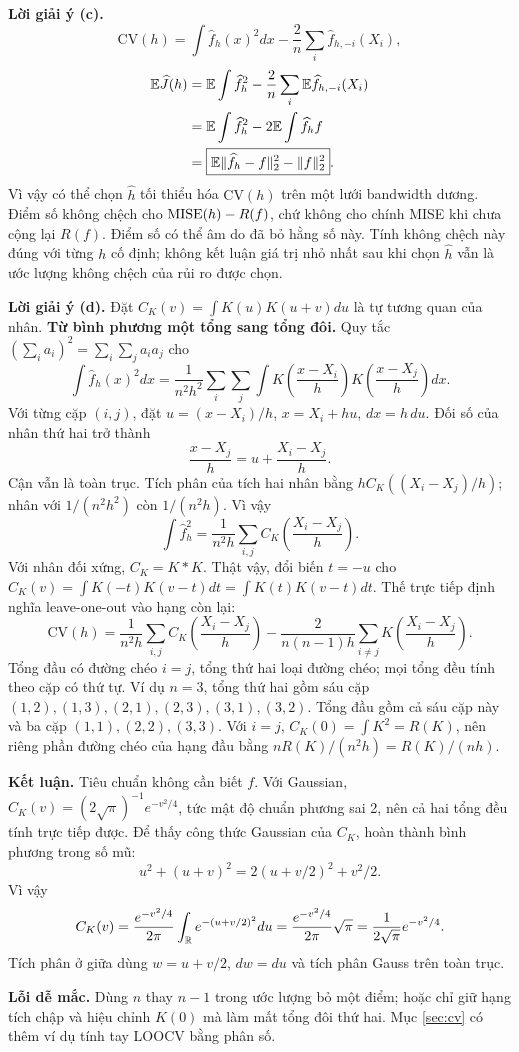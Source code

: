 \textbf{Lời giải ý (c).}
\[
\boxed{\mathrm{CV}(h)=\int\widehat f_h(x)^2dx
-\frac2n\sum_i\widehat f_{h,-i}(X_i),}
\]
\begin{align*}
\mathbb E\widehat J(h)
&=\mathbb E\int\widehat f_h^2-\frac2n\sum_i\mathbb E\widehat f_{h,-i}(X_i)\\
&=\mathbb E\int\widehat f_h^2-2\mathbb E\int\widehat f_h f\\
&=\boxed{\mathbb E\|\widehat f_h-f\|_2^2-\|f\|_2^2}.
\end{align*}
Vì vậy có thể chọn $\widehat h$ tối thiểu hóa $\mathrm{CV}(h)$ trên một lưới bandwidth dương.
Điểm số không chệch cho $\operatorname{MISE}(h)-R(f)$, chứ không cho chính MISE khi chưa cộng lại $R(f)$.
Điểm số có thể âm do đã bỏ hằng số này.
Tính không chệch này đúng với từng $h$ cố định;
không kết luận giá trị nhỏ nhất sau khi chọn $\widehat h$ vẫn là ước lượng không chệch của rủi ro được chọn.

\textbf{Lời giải ý (d).}
Đặt $C_K(v)=\int K(u)K(u+v)du$ là tự tương quan của nhân.
\textbf{Từ bình phương một tổng sang tổng đôi.}
Quy tắc $(\sum_i a_i)^2=\sum_i\sum_j a_ia_j$ cho
\[
\int\widehat f_h(x)^2dx
=\frac1{n^2h^2}\sum_i\sum_j
\int K\left(\frac{x-X_i}{h}\right)K\left(\frac{x-X_j}{h}\right)dx.
\]
Với từng cặp $(i,j)$, đặt $u=(x-X_i)/h$, $x=X_i+hu$, $dx=h\,du$.
Đối số của nhân thứ hai trở thành
\[
\frac{x-X_j}{h}=u+\frac{X_i-X_j}{h}.
\]
Cận vẫn là toàn trục. Tích phân của tích hai nhân bằng
$hC_K((X_i-X_j)/h)$; nhân với $1/(n^2h^2)$ còn $1/(n^2h)$.
Vì vậy
\[
\int\widehat f_h^2=\frac1{n^2h}\sum_{i,j}C_K\left(\frac{X_i-X_j}{h}\right).
\]
Với nhân đối xứng, $C_K=K*K$.
Thật vậy, đổi biến $t=-u$ cho
$C_K(v)=\int K(-t)K(v-t)dt=\int K(t)K(v-t)dt$.
Thế trực tiếp định nghĩa leave-one-out vào hạng còn lại:
\[
\boxed{\mathrm{CV}(h)=\frac1{n^2h}\sum_{i,j}C_K\left(\frac{X_i-X_j}{h}\right)
-\frac{2}{n(n-1)h}\sum_{i\ne j}K\left(\frac{X_i-X_j}{h}\right).}
\]
Tổng đầu có đường chéo $i=j$, tổng thứ hai loại đường chéo;
mọi tổng đều tính theo cặp có thứ tự.
Ví dụ $n=3$, tổng thứ hai gồm sáu cặp
$(1,2),(1,3),(2,1),(2,3),(3,1),(3,2)$.
Tổng đầu gồm cả sáu cặp này và ba cặp $(1,1),(2,2),(3,3)$.
Với $i=j$, $C_K(0)=\int K^2=R(K)$, nên riêng phần đường chéo
của hạng đầu bằng $nR(K)/(n^2h)=R(K)/(nh)$.

\textbf{Kết luận.} Tiêu chuẩn không cần biết $f$.
Với Gaussian, $C_K(v)=(2\sqrt\pi)^{-1}e^{-v^2/4}$, tức mật độ chuẩn phương sai 2,
nên cả hai tổng đều tính trực tiếp được.
Để thấy công thức Gaussian của $C_K$, hoàn thành bình phương trong số mũ:
\[
u^2+(u+v)^2=2(u+v/2)^2+v^2/2.
\]
Vì vậy
\[
C_K(v)=\frac{e^{-v^2/4}}{2\pi}
\int_{\mathbb R}e^{-(u+v/2)^2}du
=\frac{e^{-v^2/4}}{2\pi}\sqrt\pi
=\frac1{2\sqrt\pi}e^{-v^2/4}.
\]
Tích phân ở giữa dùng $w=u+v/2$, $dw=du$ và tích phân Gauss trên toàn trục.

\textbf{Lỗi dễ mắc.} Dùng $n$ thay $n-1$ trong ước lượng bỏ một điểm;
hoặc chỉ giữ hạng tích chập và hiệu chỉnh $K(0)$ mà làm mất tổng đôi thứ hai.
Mục \ref{sec:cv} có thêm ví dụ tính tay LOOCV bằng phân số.
